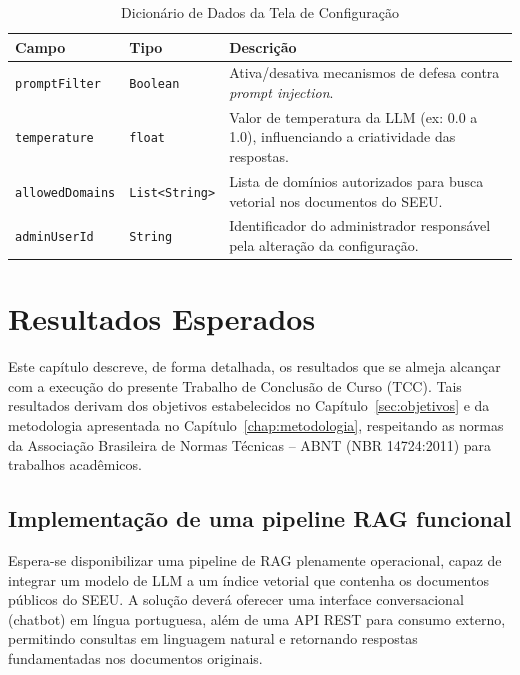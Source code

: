 \begin{table}[H]
  \centering
  \caption{Dicionário de Dados da Tela de Configuração}
  \label{tab:dd_tela_configuracao}
  \begin{tabular}{|p{3cm}|p{4cm}|p{8cm}|}
    \hline
    \textbf{Campo} & \textbf{Tipo} & \textbf{Descrição} \\ \hline
    \texttt{promptFilter} & \texttt{Boolean} & Ativa/desativa mecanismos de defesa contra \emph{prompt injection}. \\ \hline
    \texttt{temperature} & \texttt{float} & Valor de temperatura da LLM (ex: 0.0 a 1.0), influenciando a criatividade das respostas. \\ \hline
    \texttt{allowedDomains} & \texttt{List<String>} & Lista de domínios autorizados para busca vetorial nos documentos do SEEU. \\ \hline
    \texttt{adminUserId} & \texttt{String} & Identificador do administrador responsável pela alteração da configuração. \\ \hline
  \end{tabular}
\end{table}



\chapter{Resultados Esperados}
\label{chap:resultados}

Este capítulo descreve, de forma detalhada, os resultados que se almeja alcançar com a execução do presente Trabalho de Conclusão de Curso (TCC). Tais resultados derivam dos objetivos estabelecidos no Capítulo~\ref{sec:objetivos} e da metodologia apresentada no Capítulo~\ref{chap:metodologia}, respeitando as normas da Associação Brasileira de Normas Técnicas -- ABNT (NBR 14724:2011) para trabalhos acadêmicos.

\section{Implementação de uma pipeline RAG funcional}
Espera-se disponibilizar uma pipeline de RAG plenamente operacional, capaz de integrar um modelo de LLM a um índice vetorial que contenha os documentos públicos do SEEU. A solução deverá oferecer uma interface conversacional (chatbot) em língua portuguesa, além de uma API REST para consumo externo, permitindo consultas em linguagem natural e retornando respostas fundamentadas nos documentos originais.

